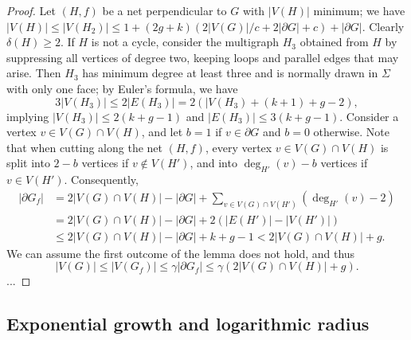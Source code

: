 \documentclass[12pt,twoside,openright,a4paper]{book}
\begin{document}
\begin{proof}
Let $(H,f)$ be a net perpendicular to $G$ with $|V(H)|$ minimum; we have
$|V(H)|\le |V(H_2)|\le 1+(2g+k)(2|V(G)|/c+2|\partial G|+c)+|\partial G|$.
Clearly $\delta(H)\ge 2$.  If $H$ is not a cycle, consider the multigraph $H_3$ obtained from $H$ by suppressing all vertices of degree two, keeping loops and parallel edges
that may arise.  Then $H_3$ has minimum degree at least three and is normally drawn in $\Sigma$ with only one face;
by Euler's formula, we have
$$3|V(H_3)|\le 2|E(H_3)|=2(|V(H_3)+(k+1)+g-2),$$
implying $|V(H_3)|\le 2(k+g-1)$ and $|E(H_3)|\le 3(k+g-1)$.
Consider a vertex $v\in V(G)\cap V(H)$, and let $b=1$ if $v\in\partial G$ and $b=0$ otherwise.
Note that when cutting along the net $(H,f)$, every vertex $v\in V(G)\cap V(H)$ is split into $2-b$ vertices
if $v\not\in V(H')$, and into $\deg_{H'}(v)-b$ vertices if $v\in V(H')$.  Consequently,
\begin{align*}
|\partial G_f|&=2|V(G)\cap V(H)|-|\partial G|+\sum_{v\in V(G)\cap V(H')} (\deg_{H'}(v)-2)\\
&=2|V(G)\cap V(H)|-|\partial G|+2(|E(H')|-|V(H')|)\\
&\le 2|V(G)\cap V(H)|-|\partial G|+k+g-1<2|V(G)\cap V(H)|+g.
\end{align*}
We can assume the first outcome of the lemma does not hold,
and thus
$$|V(G)|\le |V(G_f)|\le \gamma |\partial G_f|\le \gamma(2|V(G)\cap V(H)|+g).$$
...
\end{proof}

\subsection{Exponential growth and logarithmic radius}
\end{document}
